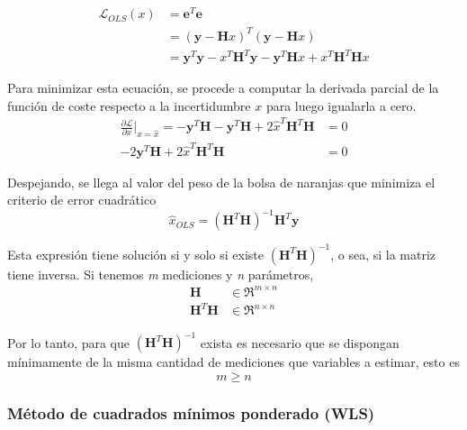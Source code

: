\begin{align}
    \mathscr{L}_{OLS}(x) &= \bm{e}^T\bm{e} \\
                        &= (\bm{y} - \bm{H}x)^T(\bm{y} - \bm{H}x) \\
                        &= \bm{y}^T\bm{y} - x^T\bm{H}^T\bm{y} - \bm{y}^T\bm{H}x + x^T\bm{H}^T\bm{H}x
\end{align}

Para minimizar esta ecuación, se procede a computar la derivada parcial de la función de coste respecto a la incertidumbre $x$ para luego igualarla a cero.
\begin{align}
    \frac{\partial \mathscr{L}}{\partial x}\bigg\rvert_{x=\hat{x}} = -\bm{y}^T\bm{H} - \bm{y}^T\bm{H} + 2\hat{x}^T\bm{H}^T\bm{H} &= 0 \\
    -2\bm{y}^T\bm{H} + 2\hat{x}^T\bm{H}^T\bm{H} &= 0
\end{align}

Despejando, se llega al valor del peso de la bolsa de naranjas que minimiza el criterio de error cuadrático
\begin{equation}
    \hat{x}_{OLS} = (\bm{H}^T\bm{H})^{-1}\bm{H}^T\bm{y}
\end{equation}

Esta expresión tiene solución si y solo si existe $(\bm{H}^T\bm{H})^{-1}$, o sea, si la matriz tiene inversa. Si tenemos \textit{m} mediciones y \textit{n} parámetros,
\begin{align*}
    \bm{H} &\in \Re^{m\times n} \\
    \bm{H}^T\bm{H} &\in \Re^{n\times n}
\end{align*}

Por lo tanto, para que $(\bm{H}^T\bm{H})^{-1}$ exista es necesario que se dispongan mínimamente de la misma cantidad de mediciones que variables a estimar, esto es
\begin{equation*}
    m \geq n
\end{equation*}

\subsubsection{Método de cuadrados mínimos ponderado (WLS)}


